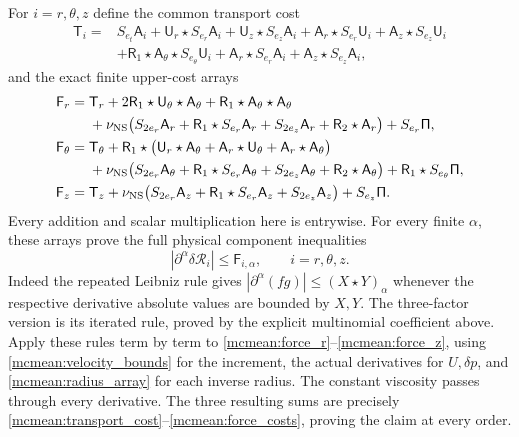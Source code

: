 \documentclass[11pt]{article}
\begin{document}
For \(i=r,\theta,z\) define the common transport cost
\begin{equation}\label{mcmean:transport_cost}
\begin{split}
 \mathsf T_i={}&S_{e_t}\mathsf A_i
 +\mathsf U_r\star S_{e_r}\mathsf A_i
 +\mathsf U_z\star S_{e_z}\mathsf A_i
 +\mathsf A_r\star S_{e_r}\mathsf U_i
 +\mathsf A_z\star S_{e_z}\mathsf U_i\\
 &+\mathsf R_1\star\mathsf A_\theta\star S_{e_\theta}\mathsf U_i
 +\mathsf A_r\star S_{e_r}\mathsf A_i
 +\mathsf A_z\star S_{e_z}\mathsf A_i,
\end{split}
\end{equation}
and the exact finite upper-cost arrays
\begin{equation}\label{mcmean:force_costs}
\begin{split}
 \mathsf F_r={}&\mathsf T_r
    +2\mathsf R_1\star\mathsf U_\theta\star\mathsf A_\theta
    +\mathsf R_1\star\mathsf A_\theta\star\mathsf A_\theta\\
 &+\nu_{\rm NS}\bigl(S_{2e_r}\mathsf A_r
       +\mathsf R_1\star S_{e_r}\mathsf A_r
       +S_{2e_z}\mathsf A_r+\mathsf R_2\star\mathsf A_r\bigr)
       +S_{e_r}\mathsf\Pi,\\
 \mathsf F_\theta={}&\mathsf T_\theta
    +\mathsf R_1\star\bigl(\mathsf U_r\star\mathsf A_\theta
                    +\mathsf A_r\star\mathsf U_\theta
                    +\mathsf A_r\star\mathsf A_\theta\bigr)\\
 &+\nu_{\rm NS}\bigl(S_{2e_r}\mathsf A_\theta
       +\mathsf R_1\star S_{e_r}\mathsf A_\theta
       +S_{2e_z}\mathsf A_\theta+\mathsf R_2\star\mathsf A_\theta\bigr)
       +\mathsf R_1\star S_{e_\theta}\mathsf\Pi,\\
 \mathsf F_z={}&\mathsf T_z
    +\nu_{\rm NS}\bigl(S_{2e_r}\mathsf A_z
       +\mathsf R_1\star S_{e_r}\mathsf A_z
       +S_{2e_z}\mathsf A_z\bigr)+S_{e_z}\mathsf\Pi.
\end{split}
\end{equation}
Every addition and scalar multiplication here is entrywise. For every
finite \(\alpha\), these arrays prove the full physical component
inequalities
\begin{equation}\label{mcmean:all_force_bounds}
 |\partial^\alpha\delta\mathcal R_i|\le\mathsf F_{i,\alpha},
 \qquad i=r,\theta,z.
\end{equation}
Indeed the repeated Leibniz rule gives
\(|\partial^\alpha(fg)|\le(X\star Y)_\alpha\) whenever the
respective derivative absolute values are bounded by \(X,Y\).
The three-factor version is its iterated rule, proved by the explicit
multinomial coefficient above. Apply these rules term by term to
\eqref{mcmean:force_r}--\eqref{mcmean:force_z}, using
\eqref{mcmean:velocity_bounds} for the increment, the actual
derivatives for \(U,\delta p\), and \eqref{mcmean:radius_array} for
each inverse radius. The constant viscosity passes through every
derivative. The three resulting sums are precisely
\eqref{mcmean:transport_cost}--\eqref{mcmean:force_costs}, proving
the claim at every order.
\end{document}
